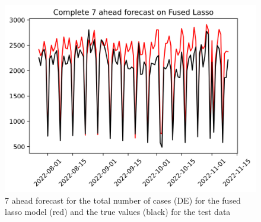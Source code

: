 \begin{figure}
\begin{minipage}{.32\textwidth}
  \label{fig:tot_cases_fc_7_flasso}
\end{minipage}
\begin{minipage}{.32\textwidth}
  \centering
  \includegraphics[width=\linewidth]{pics/7_ah/DE_Complete_7_ahead_Fused Lasso.png}
  \caption{7 ahead forecast for the total number of cases (DE) for the fused lasso model (red) and the true values (black) for the test data}
  \label{fig:tot_cases_fc_7_flasso_DE}
\end{minipage}

\end{figure}
